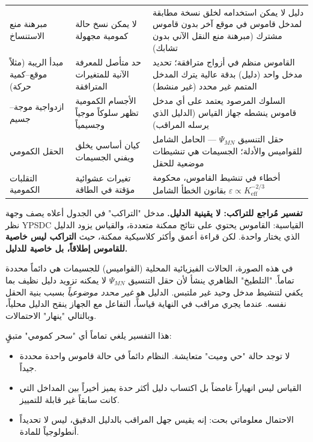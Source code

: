 \documentclass[12pt,a4paper]{article}
\theoremstyle{remark}
\begin{document}
\begin{longtable}{p{3.5cm} p{5cm} p{7cm}}
		مبرهنة منع الاستنساخ &
		لا يمكن نسخ حالة كمومية مجهولة &
		دليل لا يمكن استخدامه لخلق نسخة مطابقة لمدخل قاموس في موقع آخر بدون قاموس مشترك (مبرهنة منع النقل الآني بدون تشابك) \\
		\addlinespace
		
		مبدأ الريبة (مثلاً موقع–كمية حركة) &
		حد متأصل للمعرفة الآنية للمتغيرات المترافقة &
		القاموس منظم في أزواج مترافقة؛ تحديد مدخل واحد (دليل) بدقة عالية يترك المدخل المتمم غير محدد (غير منشط) \\
		\addlinespace
		
		ازدواجية موجة–جسيم &
		الأجسام الكمومية تظهر سلوكاً موجياً وجسيمياً &
		السلوك المرصود يعتمد على أي مدخل قاموس ينشطه جهاز القياس (الدليل الذي يرسله المراقب) \\
		\addlinespace
		
		الحقل الكمومي &
		كيان أساسي يخلق ويفني الجسيمات &
		حقل التنسيق \(\Psi_{MN}\) — الحامل الشامل للقواميس والأدلة؛ الجسيمات هي تنشيطات موضعية للحقل \\
		\addlinespace
		
		التقلبات الكمومية &
		تغيرات عشوائية مؤقتة في الطاقة &
		أخطاء في تنشيط القاموس، محكومة بقانون الخطأ الشامل \(\varepsilon \propto K_{\mathrm{eff}}^{-2/3}\) \\
	\end{longtable}
	
	\noindent
	\textbf{تفسير مُراجع للتراكب: لا يقينية الدليل.}
	مدخل "التراكب" في الجدول أعلاه يصف وجهة نظر YPSDC القياسية: القاموس يحتوي على نتائج ممكنة متعددة، والقياس يزود الدليل الذي يختار واحدة. لكن قراءة أعمق وأكثر كلاسيكية ممكنة، حيث \textbf{التراكب ليس خاصية للقاموس إطلاقاً، بل خاصية للدليل.}
	
	في هذه الصورة، الحالات الفيزيائية المحلية (القواميس) للجسيمات هي دائماً محددة تماماً. "التلطيخ" الظاهري ينشأ لأن حقل التنسيق \(\Psi_{MN}\) لا يمكنه تزويد دليل نظيف بما يكفي لتنشيط مدخل وحيد غير ملتبس. الدليل هو \emph{غير محدد موضوعياً} بسبب بنية الحقل نفسه. عندما يجري مراقب في النهاية قياساً، التفاعل مع الجهاز ينقح الدليل محلياً، وبالتالي "ينهار" الاحتمالات.
	
	هذا التفسير يلغي تماماً أي "سحر كمومي" متبقٍ:
	\begin{itemize}[leftmargin=*]
		\item لا توجد حالة "حي وميت" متعايشة. النظام دائماً في حالة قاموس واحدة محددة جيداً.
		\item القياس ليس انهياراً غامضاً بل اكتساب دليل أكثر حدة يميز أخيراً بين المداخل التي كانت سابقاً غير قابلة للتمييز.
		\item الاحتمال معلوماتي بحت: إنه يقيس جهل المراقب بالدليل الدقيق، ليس لا تحديداً أنطولوجياً للمادة.
	\end{itemize}
	
\end{document}
